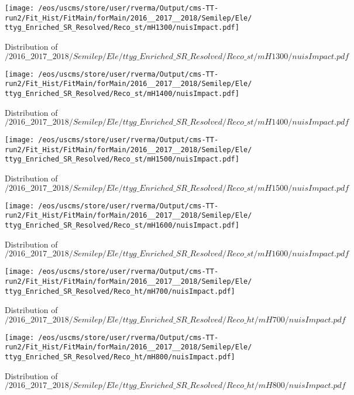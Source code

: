 \begin{figure}
\centering
\texttt{[image: /eos/uscms/store/user/rverma/Output/cms-TT-run2/Fit\_Hist/FitMain/forMain/2016\_\_2017\_\_2018/Semilep/Ele/ttyg\_Enriched\_SR\_Resolved/Reco\_st/mH1300/nuisImpact.pdf]}
\caption{Distribution of $/2016\_\_2017\_\_2018/Semilep/Ele/ttyg\_Enriched\_SR\_Resolved/Reco\_st/mH1300/nuisImpact.pdf$}
\end{figure}

\begin{figure}
\centering
\texttt{[image: /eos/uscms/store/user/rverma/Output/cms-TT-run2/Fit\_Hist/FitMain/forMain/2016\_\_2017\_\_2018/Semilep/Ele/ttyg\_Enriched\_SR\_Resolved/Reco\_st/mH1400/nuisImpact.pdf]}
\caption{Distribution of $/2016\_\_2017\_\_2018/Semilep/Ele/ttyg\_Enriched\_SR\_Resolved/Reco\_st/mH1400/nuisImpact.pdf$}
\end{figure}

\begin{figure}
\centering
\texttt{[image: /eos/uscms/store/user/rverma/Output/cms-TT-run2/Fit\_Hist/FitMain/forMain/2016\_\_2017\_\_2018/Semilep/Ele/ttyg\_Enriched\_SR\_Resolved/Reco\_st/mH1500/nuisImpact.pdf]}
\caption{Distribution of $/2016\_\_2017\_\_2018/Semilep/Ele/ttyg\_Enriched\_SR\_Resolved/Reco\_st/mH1500/nuisImpact.pdf$}
\end{figure}

\begin{figure}
\centering
\texttt{[image: /eos/uscms/store/user/rverma/Output/cms-TT-run2/Fit\_Hist/FitMain/forMain/2016\_\_2017\_\_2018/Semilep/Ele/ttyg\_Enriched\_SR\_Resolved/Reco\_st/mH1600/nuisImpact.pdf]}
\caption{Distribution of $/2016\_\_2017\_\_2018/Semilep/Ele/ttyg\_Enriched\_SR\_Resolved/Reco\_st/mH1600/nuisImpact.pdf$}
\end{figure}

\begin{figure}
\centering
\texttt{[image: /eos/uscms/store/user/rverma/Output/cms-TT-run2/Fit\_Hist/FitMain/forMain/2016\_\_2017\_\_2018/Semilep/Ele/ttyg\_Enriched\_SR\_Resolved/Reco\_ht/mH700/nuisImpact.pdf]}
\caption{Distribution of $/2016\_\_2017\_\_2018/Semilep/Ele/ttyg\_Enriched\_SR\_Resolved/Reco\_ht/mH700/nuisImpact.pdf$}
\end{figure}

\begin{figure}
\centering
\texttt{[image: /eos/uscms/store/user/rverma/Output/cms-TT-run2/Fit\_Hist/FitMain/forMain/2016\_\_2017\_\_2018/Semilep/Ele/ttyg\_Enriched\_SR\_Resolved/Reco\_ht/mH800/nuisImpact.pdf]}
\caption{Distribution of $/2016\_\_2017\_\_2018/Semilep/Ele/ttyg\_Enriched\_SR\_Resolved/Reco\_ht/mH800/nuisImpact.pdf$}
\end{figure}

